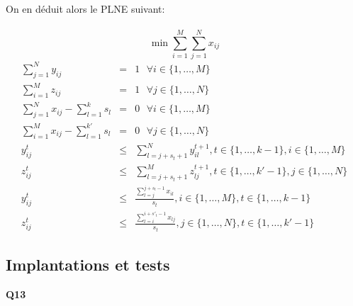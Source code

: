 \documentclass[10pt,a4paper]{article}
\begin{document}
\noindent
On en déduit alors le PLNE suivant: \\ \\
$$\min \sum_{i = 1}^M \sum_{j = 1}^N x_{ij}$$
\begin{eqnarray}
\sum_{j = 1}^N y_{ij} & = & 1 \ \ \ \forall i \in \lbrace 1, \hdots, M \rbrace \\
\sum_{i = 1}^M z_{ij} & = & 1 \ \ \ \forall j \in \lbrace 1, \hdots, N \rbrace \\
\sum_{j = 1}^N x_{ij} - \sum_{l = 1}^k s_l & = & 0 \ \ \ \forall i \in \lbrace 1, \hdots, M \rbrace \\
\sum_{i = 1}^M x_{ij} - \sum_{l = 1}^{k'} s_l & = & 0 \ \ \  \forall j \in \lbrace 1, \hdots, N \rbrace \\
y_{ij}^t & \leq & \sum_{l = j+s_t+1}^N y_{il}^{t+1} , t \in \lbrace 1, \hdots, k-1 \rbrace, i \in \lbrace 1, \hdots, M \rbrace \\
z_{ij}^t & \leq & \sum_{l = j+s_t+1}^M z_{lj}^{t+1} , t \in \lbrace 1, \hdots, k'-1 \rbrace, j \in \lbrace 1, \hdots, N \rbrace \\
y_{ij}^{t} & \leq & \frac{\sum_{l = j}^{j+s_t-1} x_{il}}{s_t} , i \in \lbrace 1, \hdots, M \rbrace, t \in \lbrace 1, \hdots, k-1 \rbrace \\
z_{ij}^{t} & \leq & \frac{\sum_{l = i}^{i+s'_t-1} x_{lj}}{s_t}, j \in \lbrace 1, \hdots, N \rbrace, t \in \lbrace 1, \hdots, k'-1 \rbrace
\end{eqnarray}

\subsection{Implantations et tests}
\noindent
\textbf{Q13}
\end{document}
